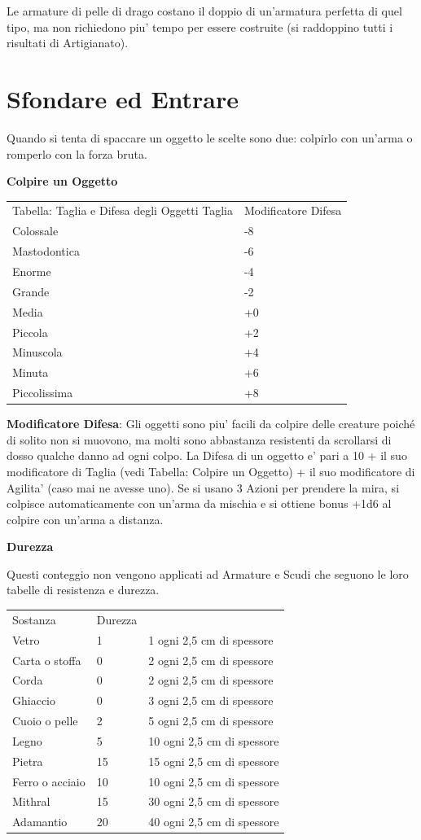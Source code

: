 \documentclass[a4paper,11pt,twoside,openany]{dndbook}
\begin{document}
{Le armature di pelle di drago costano il doppio di un'armatura perfetta di quel tipo, ma non richiedono piu' tempo per essere costruite (si raddoppino tutti i risultati di Artigianato).

\pagebreak

\section{Sfondare ed Entrare}

\label{sfondare-ed-entrare}

Quando si tenta di spaccare un oggetto le scelte sono due: colpirlo con un'arma o romperlo con la forza bruta.

\textbf{Colpire un Oggetto}

\begin{tabular}[c]{@{}ll@{}}
\toprule 
Tabella: Taglia e Difesa degli Oggetti Taglia & Modificatore Difesa\tabularnewline
Colossale & -8\tabularnewline
Mastodontica & -6\tabularnewline
Enorme & -4\tabularnewline
Grande & -2\tabularnewline
Media & +0\tabularnewline
Piccola & +2\tabularnewline
Minuscola & +4\tabularnewline
Minuta & +6\tabularnewline
Piccolissima & +8\tabularnewline
\bottomrule
\end{tabular}

\bigskip

\textbf{Modificatore Difesa}: Gli oggetti sono piu' facili da colpire delle creature poiché di solito non si muovono, ma molti sono abbastanza resistenti da scrollarsi di dosso qualche danno ad ogni colpo. La Difesa di un oggetto e' pari a 10 + il suo modificatore di Taglia (vedi Tabella: Colpire un Oggetto) + il suo modificatore di Agilita' (caso mai ne avesse uno). Se si usano 3 Azioni per prendere la mira, si colpisce automaticamente con un'arma da mischia e si ottiene bonus +1d6 al colpire con un'arma a distanza.

\textbf{Durezza}

Questi conteggio non vengono applicati ad Armature e Scudi che seguono le loro tabelle di resistenza e durezza.

\bigskip

\begin{tabular}[c]{@{}lll@{}}
\toprule 
Sostanza & Durezza & \tabularnewline
Vetro & 1 & 1 ogni 2,5 cm di spessore\tabularnewline
Carta o stoffa & 0 & 2 ogni 2,5 cm di spessore\tabularnewline
Corda & 0 & 2 ogni 2,5 cm di spessore\tabularnewline
Ghiaccio & 0 & 3 ogni 2,5 cm di spessore\tabularnewline
Cuoio o pelle & 2 & 5 ogni 2,5 cm di spessore\tabularnewline
Legno & 5 & 10 ogni 2,5 cm di spessore\tabularnewline
Pietra & 15 & 15 ogni 2,5 cm di spessore\tabularnewline
Ferro o acciaio & 10 & 10 ogni 2,5 cm di spessore\tabularnewline
Mithral & 15 & 30 ogni 2,5 cm di spessore\tabularnewline
Adamantio & 20 & 40 ogni 2,5 cm di spessore\tabularnewline
\bottomrule
\end{tabular}

}
\end{document}
